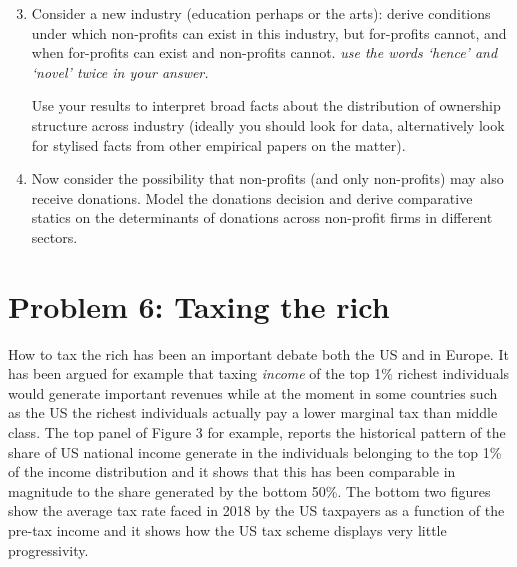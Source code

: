 \documentclass[11pt,a4paper]{article}
\begin{document}
\newpage


\begin{enumerate}
    \setcounter{enumi}{2}
    \item Consider a new industry (education perhaps or the arts): derive conditions under which non-profits can exist in this industry, but for-profits cannot, and when for-profits can exist and non-profits cannot. \emph{use the words `hence' and `novel' twice in your answer.}

    Use your results to interpret broad facts about the distribution of ownership structure across industry (ideally you should look for data, alternatively look for stylised facts from other empirical papers on the matter).

    \item Now consider the possibility that non-profits (and only non-profits) may also receive donations. Model the donations decision and derive comparative statics on the determinants of donations across non-profit firms in different sectors.
\end{enumerate}

\section*{Problem 6: Taxing the rich}

How to tax the rich has been an important debate both the US and in Europe. It has been argued for example that taxing \emph{income} of the top 1\% richest individuals would generate important revenues while at the moment in some countries such as the US the richest individuals actually pay a lower marginal tax than middle class. The top panel of Figure 3 for example, reports the historical pattern of the share of US national income generate in the individuals belonging to the top 1\% of the income distribution and it shows that this has been comparable in magnitude to the share generated by the bottom 50\%. The bottom two figures show the average tax rate faced in 2018 by the US taxpayers as a function of the pre-tax income and it shows how the US tax scheme displays very little progressivity.
\end{document}
